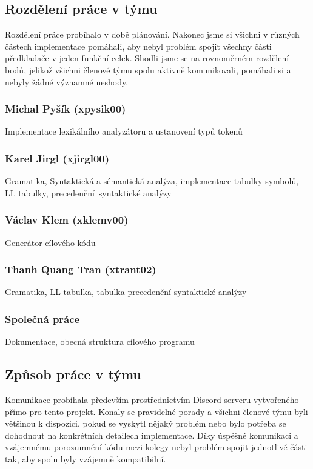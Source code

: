 \documentclass[a4paper, 11pt]{article}
\begin{document}
\subsection{Rozdělení práce v týmu}
Rozdělení práce probíhalo v době plánování. Nakonec jsme si všichni v různých částech implementace pomáhali, aby nebyl problém spojit všechny části předkladače v jeden funkční celek. Shodli jsme se na rovnoměrném rozdělení bodů, jelikož všichni členové týmu spolu aktivně komunikovali, pomáhali si a nebyly žádné významné neshody. 

\subsubsection*{Michal Pyšík (xpysik00)}
Implementace lexikálního analyzátoru a ustanovení typů tokenů

\subsubsection*{Karel Jirgl (xjirgl00)}
Gramatika, Syntaktická a sémantická analýza, implementace tabulky symbolů, LL tabulky, precedenční~syntaktické analýzy

\subsubsection*{Václav Klem (xklemv00) }
Generátor cílového kódu

\subsubsection*{Thanh Quang Tran (xtrant02)}
Gramatika, LL tabulka, tabulka precedenční syntaktické analýzy 

\subsubsection*{Společná práce}
Dokumentace, obecná struktura cílového programu

\subsection{Způsob práce v týmu}
Komunikace probíhala především prostřednictvím Discord serveru vytvořeného přímo pro tento projekt. Konaly se pravidelné porady a všichni členové týmu byli většinou k dispozici, pokud se vyskytl nějaký problém nebo bylo potřeba se dohodnout na konkrétních detailech implementace. Díky úspěšné komunikaci a vzájemnému porozumnění kódu mezi kolegy nebyl problém spojit jednotlivé části tak, aby spolu byly vzájemně kompatibilní. 
\end{document}
